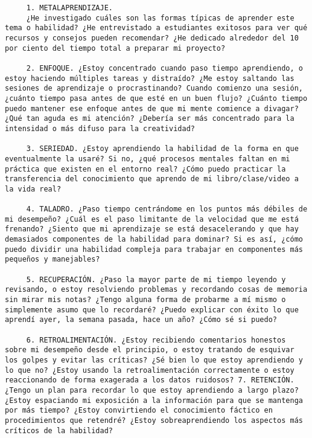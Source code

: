 \begin{verbatim}
	 1. METALAPRENDIZAJE.
	 ¿He investigado cuáles son las formas típicas de aprender este tema o habilidad? ¿He entrevistado a estudiantes exitosos para ver qué recursos y consejos pueden recomendar? ¿He dedicado alrededor del 10 por ciento del tiempo total a preparar mi proyecto?
	 
	 2. ENFOQUE. ¿Estoy concentrado cuando paso tiempo aprendiendo, o estoy haciendo múltiples tareas y distraído? ¿Me estoy saltando las sesiones de aprendizaje o procrastinando? Cuando comienzo una sesión, ¿cuánto tiempo pasa antes de que esté en un buen flujo? ¿Cuánto tiempo puedo mantener ese enfoque antes de que mi mente comience a divagar? ¿Qué tan aguda es mi atención? ¿Debería ser más concentrado para la intensidad o más difuso para la creatividad?
	 
	 3. SERIEDAD. ¿Estoy aprendiendo la habilidad de la forma en que eventualmente la usaré? Si no, ¿qué procesos mentales faltan en mi práctica que existen en el entorno real? ¿Cómo puedo practicar la transferencia del conocimiento que aprendo de mi libro/clase/video a la vida real?
	 
	 4. TALADRO. ¿Paso tiempo centrándome en los puntos más débiles de mi desempeño? ¿Cuál es el paso limitante de la velocidad que me está frenando? ¿Siento que mi aprendizaje se está desacelerando y que hay demasiados componentes de la habilidad para dominar? Si es así, ¿cómo puedo dividir una habilidad compleja para trabajar en componentes más pequeños y manejables?
	 
	 5. RECUPERACIÓN. ¿Paso la mayor parte de mi tiempo leyendo y revisando, o estoy resolviendo problemas y recordando cosas de memoria sin mirar mis notas? ¿Tengo alguna forma de probarme a mí mismo o simplemente asumo que lo recordaré? ¿Puedo explicar con éxito lo que aprendí ayer, la semana pasada, hace un año? ¿Cómo sé si puedo?
	 
	 6. RETROALIMENTACIÓN. ¿Estoy recibiendo comentarios honestos sobre mi desempeño desde el principio, o estoy tratando de esquivar los golpes y evitar las críticas? ¿Sé bien lo que estoy aprendiendo y lo que no? ¿Estoy usando la retroalimentación correctamente o estoy reaccionando de forma exagerada a los datos ruidosos? 7. RETENCIÓN. ¿Tengo un plan para recordar lo que estoy aprendiendo a largo plazo? ¿Estoy espaciando mi exposición a la información para que se mantenga por más tiempo? ¿Estoy convirtiendo el conocimiento fáctico en procedimientos que retendré? ¿Estoy sobreaprendiendo los aspectos más críticos de la habilidad?
	 

\end{verbatim}
